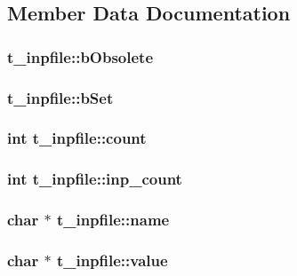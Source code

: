 \subsection{\-Member \-Data \-Documentation}
\hypertarget{structt__inpfile_ab0e307d2b1457a75ab8e02d30f90fcb3}{
\subsubsection[{b\-Obsolete}]{ {\bf t\-\_\-inpfile\-::b\-Obsolete}}}\label{structt__inpfile_ab0e307d2b1457a75ab8e02d30f90fcb3}
\hypertarget{structt__inpfile_a6a1dc761910f299b8eac3e109fca1746}{
\subsubsection[{b\-Set}]{ {\bf t\-\_\-inpfile\-::b\-Set}}}\label{structt__inpfile_a6a1dc761910f299b8eac3e109fca1746}
\hypertarget{structt__inpfile_ac2b088ab77a0008afdcafc07999d6e4a}{
\subsubsection[{count}]{\setlength{\rightskip}{0pt plus 5cm}int {\bf t\-\_\-inpfile\-::count}}}\label{structt__inpfile_ac2b088ab77a0008afdcafc07999d6e4a}
\hypertarget{structt__inpfile_a783b9464a942e0b1a39911559d710adc}{
\subsubsection[{inp\-\_\-count}]{\setlength{\rightskip}{0pt plus 5cm}int {\bf t\-\_\-inpfile\-::inp\-\_\-count}}}\label{structt__inpfile_a783b9464a942e0b1a39911559d710adc}
\hypertarget{structt__inpfile_a27a9732bdcf8d59e5bc7d55ed6e9a139}{
\subsubsection[{name}]{\setlength{\rightskip}{0pt plus 5cm}char $\ast$ {\bf t\-\_\-inpfile\-::name}}}\label{structt__inpfile_a27a9732bdcf8d59e5bc7d55ed6e9a139}
\hypertarget{structt__inpfile_ade98bed6c75fdb7cd3bff07dac1dedc4}{
\subsubsection[{value}]{\setlength{\rightskip}{0pt plus 5cm}char $\ast$ {\bf t\-\_\-inpfile\-::value}}}\label{structt__inpfile_ade98bed6c75fdb7cd3bff07dac1dedc4}


